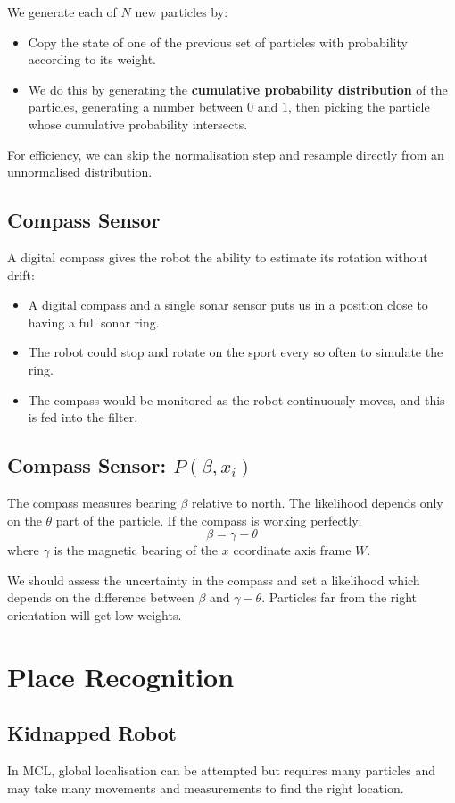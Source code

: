 \documentclass[11pt]{article}
\begin{document}
We generate each of $N$ new particles by:
\begin{itemize}
  \item Copy the state of one of the previous set of particles with probability according to its weight.
  \item We do this by generating the \textbf{cumulative probability distribution} of the particles, generating a number between $0$ and $1$, then picking the particle whose cumulative probability intersects.
\end{itemize}

For efficiency, we can skip the normalisation step and resample directly from an unnormalised distribution.

\subsection{Compass Sensor}
A digital compass gives the robot the ability to estimate its rotation without drift:
\begin{itemize}
  \item A digital compass and a single sonar sensor puts us in a position close to having a full sonar ring.
  \item The robot could stop and rotate on the sport every so often to simulate the ring.
  \item The compass would be monitored as the robot continuously moves, and this is fed into the filter.
\end{itemize}

\subsection{Compass Sensor: $P(\beta, x_i)$}
The compass measures bearing $\beta$ relative to north.
The likelihood depends only on the $\theta$ part of the particle.
If the compass is working perfectly:
\[
  \beta = \gamma - \theta
\]
where $\gamma$ is the magnetic bearing of the $x$ coordinate axis frame $W$.

We should assess the uncertainty in the compass and set a likelihood which depends on the difference between $\beta$ and $\gamma - \theta$.
Particles far from the right orientation will get low weights.

\section{Place Recognition}
\subsection{Kidnapped Robot}
In MCL, global localisation can be attempted but requires many particles and may take many movements and measurements to find the right location.
\end{document}
